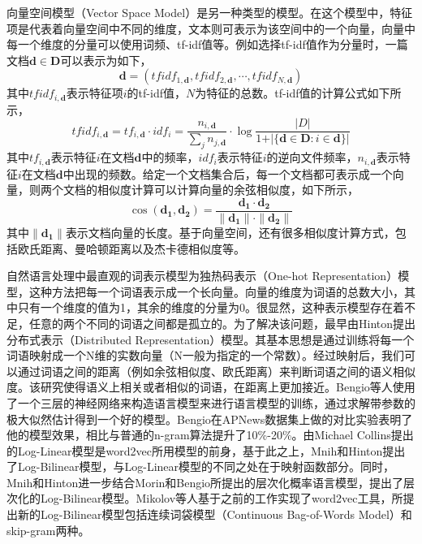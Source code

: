 向量空间模型（Vector Space Model）是另一种类型的模型。在这个模型中，特征项是代表着向量空间中不同的维度，文本则可表示为该空间中的一个向量，向量中每一个维度的分量可以使用词频、tf-idf值等。例如选择tf-idf值作为分量时，一篇文档$\mathbf{d} \in \mathbf{D}$可以表示为如下，
\begin{equation}
\label{eq:documentVec}
	\mathbf{d} = \left({tfidf}_{1,\mathbf{d}}, {tfidf}_{2,\mathbf{d}}, \cdots, {tfidf}_{N,\mathbf{d}}\right)
\end{equation}
其中${tfidf}_{i,\mathbf{d}}$表示特征项$i$的tf-idf值，$N$为特征的总数。tf-idf值的计算公式如下所示，
\begin{equation}
\label{eq:tfidfFormula}
	{tfidf}_{i,\mathbf{d}} = {tf}_{i,\mathbf{d}} \cdot {idf}_i = \frac{n_{i,\mathbf{d}}}{\sum_j n_{j,\mathbf{d}}} \cdot \log{\frac{|D|}{1 + \vert \{\mathbf{d} \in \mathbf{D} : i \in \mathbf{d}\}\vert}} 
\end{equation}
其中${tf}_{i,\mathbf{d}}$表示特征$i$在文档$\mathbf{d}$中的频率，${idf}_i$表示特征$i$的逆向文件频率，$n_{i,\mathbf{d}}$表示特征$i$在文档$\mathbf{d}$中出现的频数。给定一个文档集合后，每一个文档都可表示成一个向量，则两个文档的相似度计算可以计算向量的余弦相似度，如下所示，
\begin{equation}
\label{eq:cosSim}
	\cos \left( \mathbf{d_1}, \mathbf{d_2} \right) = \frac{\mathbf{d_1} \cdot \mathbf{d_2}}{\| \mathbf{d_1} \| \cdot \| \mathbf{d_2} \|}
\end{equation}
其中$\| \mathbf{d_1} \|$表示文档向量的长度。基于向量空间，还有很多相似度计算方式，包括欧氏距离、曼哈顿距离以及杰卡德相似度等。

自然语言处理中最直观的词表示模型为独热码表示（One-hot Representation）模型，这种方法把每一个词语表示成一个长向量。向量的维度为词语的总数大小，其中只有一个维度的值为1，其余的维度的分量为0。很显然，这种表示模型存在着不足，任意的两个不同的词语之间都是孤立的。为了解决该问题，最早由Hinton提出分布式表示（Distributed Representation）模型。其基本思想是通过训练将每一个词语映射成一个N维的实数向量（N一般为指定的一个常数）。经过映射后，我们可以通过词语之间的距离（例如余弦相似度、欧氏距离）来判断词语之间的语义相似度。该研究使得语义上相关或者相似的词语，在距离上更加接近。Bengio等人使用了一个三层的神经网络来构造语言模型来进行语言模型的训练，通过求解带参数的极大似然估计得到一个好的模型。Bengio在APNews数据集上做的对比实验表明了他的模型效果，相比与普通的n-gram算法提升了10\%-20\%。由Michael Collins提出的Log-Linear模型是word2vec所用模型的前身，基于此之上，Mnih和Hinton提出了Log-Bilinear模型，与Log-Linear模型的不同之处在于映射函数部分。同时，Mnih和Hinton进一步结合Morin和Bengio所提出的层次化概率语言模型，提出了层次化的Log-Bilinear模型。Mikolov等人基于之前的工作实现了word2vec工具，所提出新的Log-Bilinear模型包括连续词袋模型（Continuous	Bag-of-Words	Model）和skip-gram两种。

